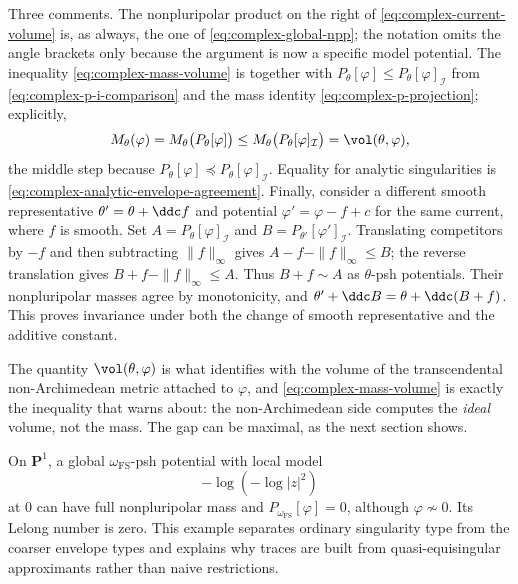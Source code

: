 Three comments.  The nonpluripolar product on the right of
\eqref{eq:complex-current-volume} is, as always, the one of
\eqref{eq:complex-global-npp}; the notation omits the angle brackets only
because the argument is now a specific model potential.  The inequality
\eqref{eq:complex-mass-volume} is
 together with
$P_\theta[\varphi]\leq P_\theta[\varphi]_{\mathcal I}$ from
\eqref{eq:complex-p-i-comparison} and the mass identity
\eqref{eq:complex-p-projection}; explicitly,
\[
 M_\theta(\varphi)
 =M_\theta\bigl(P_\theta[\varphi]\bigr)
 \leq M_\theta\bigl(P_\theta[\varphi]_{\mathcal I}\bigr)
 =\vol(\theta,\varphi),
\]
the middle step because $P_\theta[\varphi]\preceq
P_\theta[\varphi]_{\mathcal I}$.  Equality for analytic singularities is
\eqref{eq:complex-analytic-envelope-agreement}.  Finally, consider a different smooth representative
$\theta'=\theta+\ddc f$ and potential $\varphi'=\varphi-f+c$ for
the same current, where $f$ is smooth.  Set
$A=P_\theta[\varphi]_{\mathcal I}$ and
$B=P_{\theta'}[\varphi']_{\mathcal I}$.  Translating competitors by
$-f$ and then subtracting $\|f\|_\infty$ gives
$A-f-\|f\|_\infty\leq B$; the reverse translation gives
$B+f-\|f\|_\infty\leq A$.
Thus $B+f\sim A$ as $\theta$-psh potentials.  Their nonpluripolar
masses agree by monotonicity, and
$\theta'+\ddc B=\theta+\ddc(B+f)$.  This proves invariance under
both the change of smooth representative and the additive constant.

The quantity $\vol(\theta,\varphi)$ is what
 identifies with the volume of the
transcendental non-Archimedean metric attached to $\varphi$, and
\eqref{eq:complex-mass-volume} is exactly the inequality that
 warns about: the non-Archimedean side
computes the \emph{ideal} volume, not the mass.  The gap can be
maximal, as the next section shows.

\begin{example}
\label{ex:complex-loglog-envelope}
On $\mathbf P^1$, a global $\omega_{\mathrm{FS}}$-psh potential with
local model
\[
                        -\log(-\log|z|^2)
\]
at $0$ can have full nonpluripolar mass and
$P_{\omega_{\mathrm{FS}}}[\varphi]=0$, although
$\varphi\not\sim0$.  Its Lelong number is zero.  This example separates
ordinary singularity type from the coarser envelope types and explains
why traces are built from quasi-equisingular approximants rather than
naive restrictions.
\end{example}

